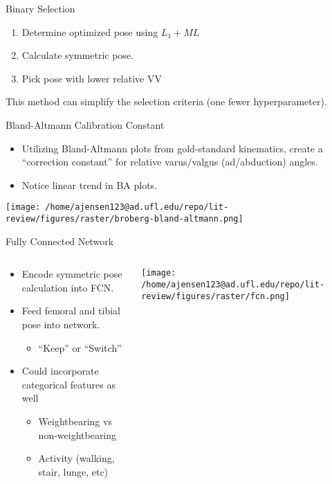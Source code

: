 \documentclass[presentation, aspectratio=1610]{beamer}
\begin{document}
\begin{frame}[label={sec:orgc110357}]{Binary Selection}
\begin{enumerate}
\item Determine optimized pose using \(L_1 + ML\)
\item Calculate symmetric pose.
\item Pick pose with lower relative VV
\end{enumerate}

This method can simplify the selection criteria (one fewer hyperparameter).
\end{frame}
\begin{frame}[label={sec:orge1b5ebc}]{Bland-Altmann Calibration Constant}
\begin{itemize}
\item Utilizing Bland-Altmann plots from gold-standard kinematics, create a ``correction constant'' for relative varus/valgus (ad/abduction) angles.
\item Notice linear trend in BA plots.
\end{itemize}
\begin{center}
\texttt{[image: /home/ajensen123@ad.ufl.edu/repo/lit-review/figures/raster/broberg-bland-altmann.png]}
\end{center}
\end{frame}
\begin{frame}[label={sec:org5d9e76b}]{Fully Connected Network}
\begin{columns}
\begin{column}{0.5\columnwidth}
\begin{itemize}
\item Encode symmetric pose calculation into FCN.
\item Feed femoral and tibial \alert{\alert{pose}} into network.
\begin{itemize}
\item ``Keep'' or ``Switch''
\end{itemize}
\item Could incorporate categorical features as well
\begin{itemize}
\item Weightbearing vs non-weightbearing
\item Activity (walking, stair, lunge, etc)
\end{itemize}
\end{itemize}
\end{column}
\begin{column}{0.6\columnwidth}
\begin{center}
\texttt{[image: /home/ajensen123@ad.ufl.edu/repo/lit-review/figures/raster/fcn.png]}
\end{center}
\end{column}
\end{columns}
\end{frame}
\end{document}
